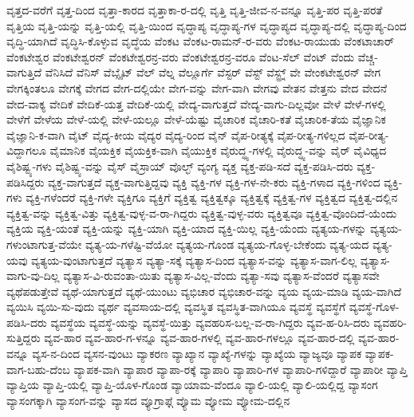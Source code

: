 {ವೃತ್ತದ-ವರೆಗೆ
ವೃತ್ತ-ದಿಂದ
ವೃತ್ತಾ-ಕಾರದ
ವೃತ್ತಾಕಾ-ರ-ದಲ್ಲಿ
ವೃತ್ತಿ
ವೃತ್ತಿ-ಜೀವ-ನ-ವನ್ನೂ
ವೃತ್ತಿ-ಪರ
ವೃತ್ತಿ-ಪರತೆ
ವೃತ್ತಿಯ
ವೃತ್ತಿ-ಯನ್ನು
ವೃತ್ತಿ-ಯಲ್ಲಿ
ವೃತ್ತಿ-ಯಿಂದ
ವೃದ್ಧಾಪ್ಯ
ವೃದ್ಧಾಪ್ಯ-ಗಳ
ವೃದ್ಧಾಪ್ಯದ
ವೃದ್ಧಾಪ್ಯ-ದಲ್ಲಿ
ವೃದ್ಧಾಪ್ಯ-ದಿಂದ
ವೃದ್ಧಿ-ಯಾಗಿದೆ
ವೃದ್ಧಿಸಿ-ಕೊಳ್ಳುವ
ವೃದ್ಧೆಯ
ವೆಂಕಟ
ವೆಂಕಟ-ರಾಮನ್-ರ-ವರು
ವೆಂಕಟ-ರಾಯುಡು
ವೆಂಕಟಾಚಾರ್
ವೆಂಕಟೇಶ್ವರ
ವೆಂಕಟೇಶ್ವರನ್
ವೆಂಕಟೇಶ್ವರನ್ರ-ವರು
ವೆಂಕಟೇಶ್ವರನ್ರ-ವರೂ
ವೆಂಟ-ಸೆಲ್
ವೆಂಟ್
ವೆಂದು
ವೆಚ್ಚ-ವಾಗುತ್ತಿದೆ
ವೆನಿಸಿದೆ
ವೆನಿಸ್
ವೆಬ್ಸೈಟ್
ವೆಲ್
ವೆಲ್ನ
ವೆಲ್ಲೂರ್ಗೆ
ವೆಸ್ಟರ್
ವೆಸ್ಟ್
ವೆಸ್ಟ್ರ್ನ್
ವೇ
ವೇಂಕಟೇಶ್ವರನ್
ವೇಗ
ವೇಗಕ್ಕಿಂತಲೂ
ವೇಗಕ್ಕೆ
ವೇಗದ
ವೇಗ-ದಲ್ಲಿಯೇ
ವೇಗ-ವನ್ನು
ವೇಗ-ವಾಗಿ
ವೇಗವು
ವೇತನ
ವೇತ್ತನು
ವೇದ
ವೇದನೆ
ವೇದ-ವಾಕ್ಯ
ವೇದಿಕೆ
ವೇದಿಕೆ-ಯತ್ತ
ವೇದಿಕೆ-ಯಲ್ಲಿ
ವೇದ್ಯ-ವಾಗುತ್ತದೆ
ವೇದ್ಯ-ವಾಗು-ದಿಲ್ಲವೋ
ವೇಳೆ
ವೇಳೆ-ಗಳಲ್ಲಿ
ವೇಳೆಗೆ
ವೇಳೆಯ
ವೇಳೆ-ಯಲ್ಲಿ
ವೇಳೆ-ಯಲ್ಲೂ
ವೇಳೆ-ಯೆಷ್ಟು
ವೈಚಾರಿಕ
ವೈಚಾರಿ-ಕತೆ
ವೈಚಾರಿಕ-ತೆಯ
ವೈಜ್ಞಾನಿಕ
ವೈಜ್ಞಾನಿ-ಕ-ವಾಗಿ
ವೈಟ್
ವೈದ್ಯ-ಕೀಯ
ವೈದ್ಯರ
ವೈದ್ಯ-ರಿಂದ
ವೈನ್
ವೈಪ-ರೀತ್ಯಕ್ಕೆ
ವೈಪ-ರೀತ್ಯ-ಗಳಿಲ್ಲದ
ವೈಪ-ರೀತ್ಯ-ವಿದ್ದಾಗಲೂ
ವೈಮಾನಿಕ
ವೈಯಕ್ತಿಕ
ವೈಯಕ್ತಿಕ-ವಾಗಿ
ವೈಯುಕ್ತಿಕ
ವೈರುದ್ಧ್ಯ-ಗಳಲ್ಲಿ
ವೈರುದ್ಧ್ಯ-ವನ್ನು
ವೈರ್
ವೈವಿಧ್ಯದ
ವೈಶಿಷ್ಟ್ಯ-ಗಳು
ವೈಶಿಷ್ಟ್ಯ-ವನ್ನು
ವೈಸ್
ವೈಸ್ರಾಯ್
ವೊಲ್ಛ್
ವ್ಯಂಗ್ಯ
ವ್ಯಕ್ತ
ವ್ಯಕ್ತ-ಪಡಿ-ಸದೆ
ವ್ಯಕ್ತ-ಪಡಿಸಿ-ದರು
ವ್ಯಕ್ತ-ಪಡಿಸಿದ್ದರು
ವ್ಯಕ್ತ-ವಾಗುತ್ತದೆ
ವ್ಯಕ್ತ-ವಾಗುತ್ತಿದ್ದವು
ವ್ಯಕ್ತಿ
ವ್ಯಕ್ತಿ-ಗಳ
ವ್ಯಕ್ತಿ-ಗಳ-ನೇ-ಕರು
ವ್ಯಕ್ತಿ-ಗಳಾದ
ವ್ಯಕ್ತಿ-ಗಳಿಂದ
ವ್ಯಕ್ತಿ-ಗಳು
ವ್ಯಕ್ತಿ-ಗಳೆಂದರೆ
ವ್ಯಕ್ತಿ-ಗಳೇ
ವ್ಯಕ್ತಿಗೂ
ವ್ಯಕ್ತಿಗೆ
ವ್ಯಕ್ತಿತ್ವ
ವ್ಯಕ್ತಿತ್ವಕ್ಕೂ
ವ್ಯಕ್ತಿತ್ವಕ್ಕೆ
ವ್ಯಕ್ತಿತ್ವ-ಗಳ
ವ್ಯಕ್ತಿತ್ವದ
ವ್ಯಕ್ತಿತ್ವ-ದಲ್ಲಿನ
ವ್ಯಕ್ತಿತ್ವ-ವನ್ನು
ವ್ಯಕ್ತಿತ್ವ-ವಿತ್ತು
ವ್ಯಕ್ತಿತ್ವ-ವುಳ್ಳ-ವ-ರಾ-ಗಿದ್ದರು
ವ್ಯಕ್ತಿತ್ವ-ವುಳ್ಳ-ವರು
ವ್ಯಕ್ತಿತ್ವವೂ
ವ್ಯಕ್ತಿತ್ವ-ವೊಂದಿದೆ-ಯೆಂದು
ವ್ಯಕ್ತಿಯ
ವ್ಯಕ್ತಿ-ಯಂತೆ
ವ್ಯಕ್ತಿ-ಯನ್ನು
ವ್ಯಕ್ತಿ-ಯಾಗಿ
ವ್ಯಕ್ತಿ-ಯಾದ
ವ್ಯಕ್ತಿ-ಯಿಲ್ಲ
ವ್ಯಕ್ತಿ-ಯೆಂದು
ವ್ಯತ್ಯಯ-ಗಳನ್ನು
ವ್ಯತ್ಯಯ-ಗಳುಂಟಾಗುತ್ತ-ವೆಯೇ
ವ್ಯತ್ಯ-ಯ-ಗಳೆಷ್ಟಿ-ವೆಯೋ
ವ್ಯತ್ಯಯ-ಗೊಂಡ
ವ್ಯತ್ಯಯ-ಗೊಳ್ಳ-ಬೇಕೆಂದು
ವ್ಯತ್ಯ-ಯದ
ವ್ಯತ್ಯ-ಯವು
ವ್ಯತ್ಯಯ-ವುಂಟಾಗುತ್ತದೆ
ವ್ಯತ್ಯಾಸ
ವ್ಯತ್ಯಾ-ಸಕ್ಕೆ
ವ್ಯತ್ಯಾಸ-ದಿಂದ
ವ್ಯತ್ಯಾಸ-ವನ್ನು
ವ್ಯತ್ಯಾಸ-ವಾಗ-ಲಿಲ್ಲ
ವ್ಯತ್ಯಾಸ-ವಾಗು-ವು-ದಿಲ್ಲ
ವ್ಯತ್ಯಾಸ-ವಿ-ರುವಂತಾ-ಯಿತು
ವ್ಯತ್ಯಾಸ-ವಿಲ್ಲ-ವೆಂದು
ವ್ಯತ್ಯಾ-ಸವು
ವ್ಯತ್ಯಾಸ-ವೆಂದರೆ
ವ್ಯತ್ಯಾಸವೇ
ವ್ಯಥೆಪಡುತ್ತೇವೆ
ವ್ಯಥೆ-ಯಾಗುತ್ತದೆ
ವ್ಯಥೆ-ಯುಂಟು
ವ್ಯಭಿಚಾರ
ವ್ಯಭಿಚಾರ-ವನ್ನು
ವ್ಯಯ
ವ್ಯಯ-ಮಾಡಿ
ವ್ಯಯ-ವಾಗಿದೆ
ವ್ಯಯಿಸಿ
ವ್ಯಯಿ-ಸು-ವುದು
ವ್ಯರ್ಥ
ವ್ಯವಸಾಯ-ದಲ್ಲಿ
ವ್ಯವಸ್ಥಿತ
ವ್ಯವಸ್ಥಿತ-ವಾಗಿಯೂ
ವ್ಯವಸ್ಥೆ
ವ್ಯವಸ್ಥೆಗೆ
ವ್ಯವಸ್ಥೆ-ಗೊಳ-ಪಡಿಸಿ-ದರು
ವ್ಯವಸ್ಥೆಯ
ವ್ಯವಸ್ಥೆ-ಯನ್ನು
ವ್ಯವಸ್ಥೆ-ಯಿತ್ತು
ವ್ಯವಹರಿಸ-ಬಲ್ಲ-ವ-ರಾ-ಗಿದ್ದರು
ವ್ಯವ-ಹ-ರಿಸಿ-ದರು
ವ್ಯವಹರಿ-ಸುತ್ತಿದ್ದರು
ವ್ಯವ-ಹಾರ
ವ್ಯವ-ಹಾರ-ಗ-ಳನ್ನೂ
ವ್ಯವ-ಹಾರ-ಗಳಲ್ಲಿ
ವ್ಯವ-ಹಾರ-ಗಳಲ್ಲೂ
ವ್ಯವ-ಹಾರ-ದಲ್ಲಿ
ವ್ಯವ-ಹಾರ-ವನ್ನೂ
ವ್ಯಸ-ನ-ದಿಂದ
ವ್ಯಸನ-ವುಂಟು
ವ್ಯಾಕರಣ
ವ್ಯಾಖ್ಯಾನ
ವ್ಯಾಖ್ಯೆ-ಗಳನ್ನು
ವ್ಯಾಖ್ಯೆಯ
ವ್ಯಾಜ್ಯವೂ
ವ್ಯಾಪಕ
ವ್ಯಾಪಕ-ವಾಗ-ಬಹು-ದೆಂಬ
ವ್ಯಾಪಕ-ವಾಗಿ
ವ್ಯಾಪಾರ
ವ್ಯಾಪಾ-ರಕ್ಕೆ
ವ್ಯಾಪಾರಿ
ವ್ಯಾಪಾರಿ-ಗಳ
ವ್ಯಾಪಾರಿ-ಗಳಿದ್ದಾರೆ
ವ್ಯಾಪಾರೀ
ವ್ಯಾಪ್ತಿ
ವ್ಯಾಪ್ತಿಯ
ವ್ಯಾಪ್ತಿ-ಯಲ್ಲಿ
ವ್ಯಾಪ್ತಿ-ಯೊಳ-ಗೊಂಡ
ವ್ಯಾಯಾಮ-ವೆಂದೂ
ವ್ಯಾಲಿ-ಯಲ್ಲಿ
ವ್ಯಾಲಿ-ಯಲ್ಲಿದ್ದ
ವ್ಯಾಸಂಗ
ವ್ಯಾಸಂಗಕ್ಕಾಗಿ
ವ್ಯಾಸಂಗ-ವನ್ನು
ವ್ಯಾಸದ
ವ್ಯೂಗ್ರಾಫ್ಗೆ
ವ್ಯೊಮ
ವ್ಯೋಮ
ವ್ಯೋಮ-ದಲ್ಲಿನ
}

